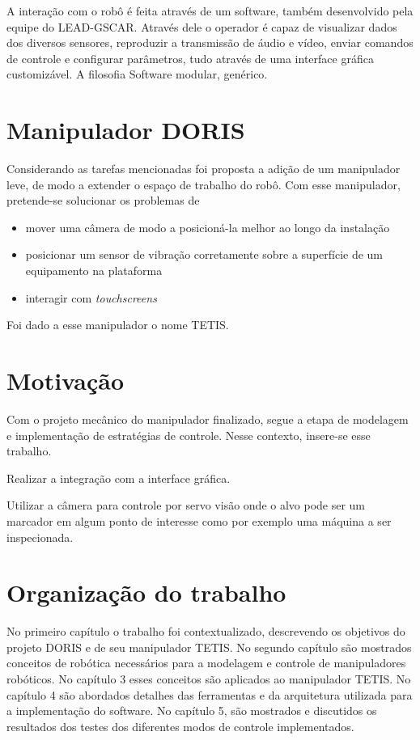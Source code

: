 A interação com o robô é feita através de um software, também desenvolvido pela equipe do LEAD-GSCAR. Através dele o operador é capaz de visualizar dados dos diversos sensores, reproduzir a transmissão de áudio e vídeo, enviar comandos de controle e configurar parâmetros, tudo através de uma interface gráfica customizável. A filosofia Software modular, genérico.

\section{Manipulador DORIS}
Considerando as tarefas mencionadas foi proposta a adição de um manipulador leve, de modo a extender o espaço de trabalho do robô. Com esse manipulador, pretende-se solucionar os problemas de
\begin{itemize}
\item mover uma câmera de modo a posicioná-la melhor ao longo da instalação
\item posicionar um sensor de vibração corretamente sobre a superfície de um equipamento na plataforma
\item interagir com \textit{touchscreens}
\end{itemize}

Foi dado a esse manipulador o nome TETIS. 

\section{Motivação}
Com o projeto mecânico do manipulador finalizado, segue a etapa de modelagem e implementação de estratégias de controle. Nesse contexto, insere-se esse trabalho. 

Realizar a integração com a interface gráfica. 

Utilizar a câmera para controle por servo visão onde o alvo pode ser um marcador em algum ponto de interesse como por exemplo uma máquina a ser inspecionada. 

\section{Organização do trabalho}

No primeiro capítulo o trabalho foi contextualizado, descrevendo os objetivos do projeto DORIS e de seu manipulador TETIS. No segundo capítulo são mostrados conceitos de robótica necessários para a modelagem e controle de manipuladores robóticos. No capítulo 3 esses conceitos são aplicados ao manipulador TETIS. No capítulo 4 são abordados detalhes das ferramentas e da arquitetura utilizada para a implementação do software. No capítulo 5, são mostrados e discutidos os resultados dos testes dos diferentes modos de controle implementados. 